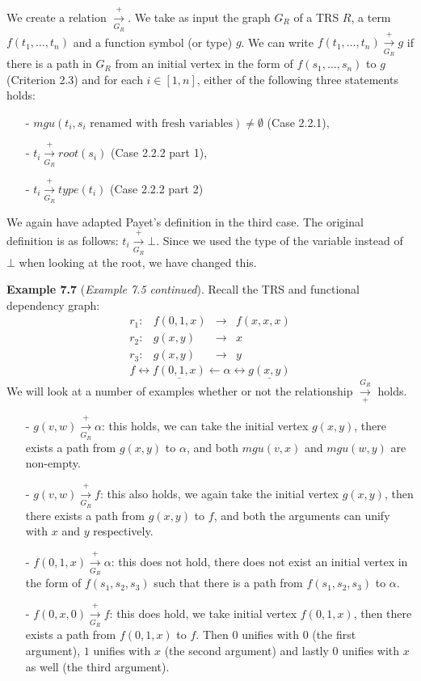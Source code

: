 \begin{definition}
\label{def:arrowrelation}
We create a relation $\xrightarrow[G_R]{+}$. We take as input the graph $G_R$ of a TRS $R$, a term $f(t_1, \dots, t_n)$ and a function symbol (or type) $g$. We can write $f(t_1, \dots, t_n) \xrightarrow[G_R]{+} g$ if there is a path in $G_R$ from an initial vertex in the form of $f(s_1, \dots, s_n)$ to $g$ (Criterion 2.3) and for each $i \in [1, n]$, either of the following three statements holds:
\begin{itemize}
    \itemsep -0.2em
    \item[-] $\textit{mgu}(t_i, s_i \text{ renamed with fresh variables}) \neq \emptyset$ (Case 2.2.1),
    \item[-] $t_i \xrightarrow[G_R]{+} \textit{root}(s_i)$ (Case 2.2.2 part 1),
    \item[-] $t_i \xrightarrow[G_R]{+} \textit{type}(t_i)$ (Case 2.2.2 part 2)
\end{itemize}
\end{definition}

We again have adapted Payet's definition in the third case. The original definition is as follows: $t_i \xrightarrow[G_R]{+} \bot$. Since we used the type of the variable instead of $\bot$ when looking at the root, we have changed this.

\textbf{Example 7.7} (\textit{Example 7.5 continued}). Recall the TRS and functional dependency graph:
\[
\begin{array}{lrcl}
    r_1: & f(0, 1, x) & \rightarrow & f(x, x, x) \\
    r_2: & g(x, y) & \rightarrow & x \\
    r_3: & g(x, y) & \rightarrow & y
\end{array}
\]
\[
f \longleftrightarrow \underline{f(0, 1, x)} \longleftarrow \alpha \longleftrightarrow \underline{g(x,y)}
\]
We will look at a number of examples whether or not the relationship $\xrightarrow[+]{G_R}$ holds. 
\begin{itemize}
    \itemsep 0em
    \item[-] $g(v, w) \xrightarrow[G_R]{+} \alpha$: this holds, we can take the initial vertex $g(x, y)$, there exists a path from $g(x, y)$ to $\alpha$, and both $\textit{mgu}(v, x)$ and $\textit{mgu}(w, y)$ are non-empty. 
    \item[-] $g(v, w) \xrightarrow[G_R]{+} f$: this also holds, we again take the initial vertex $g(x, y)$, then there exists a path from $g(x, y)$ to $f$, and both the arguments can unify with $x$ and $y$ respectively. 
    \item[-] $f(0, 1, x) \xrightarrow[G_R]{+} \alpha$: this does not hold, there does not exist an initial vertex in the form of $f(s_1, s_2, s_3)$ such that there is a path from $f(s_1, s_2, s_3)$ to $\alpha$.
    \item[-] $f(0, x, 0) \xrightarrow[G_R]{+} f$: this does hold, we take initial vertex $f(0, 1, x)$, then there exists a path from $f(0, 1, x)$ to $f$. Then $0$ unifies with $0$ (the first argument), $1$ unifies with $x$ (the second argument) and lastly $0$ unifies with $x$ as well (the third argument).  
\end{itemize}

